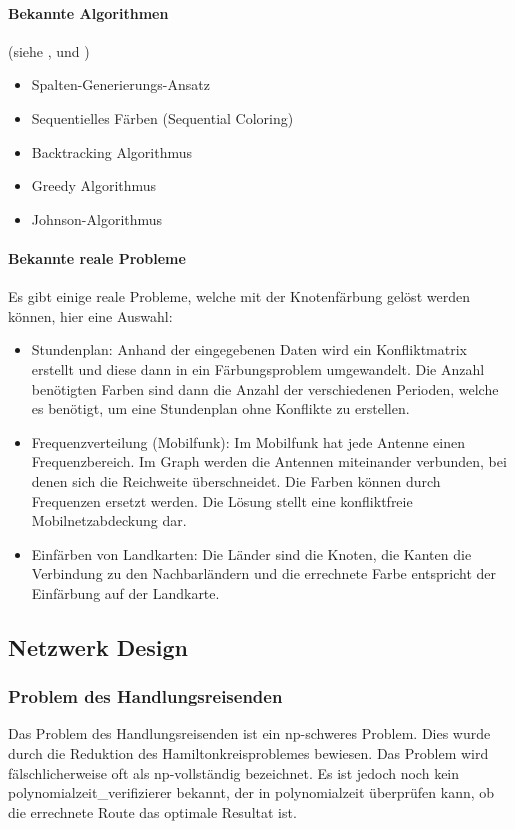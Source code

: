 	\paragraph{Bekannte Algorithmen}
	(siehe \cite{seminar_algo_graph}, \cite{krumke2012graphentheoretische} und \cite{seminar_rob_graphen})
	\begin{itemize}
		\item Spalten-Generierungs-Ansatz
		\item Sequentielles Färben (Sequential Coloring)
		\item Backtracking Algorithmus
		\item Greedy Algorithmus
		\item Johnson-Algorithmus
	\end{itemize}	

	\paragraph{Bekannte reale Probleme}	
	Es gibt einige reale Probleme, welche mit der Knotenfärbung gelöst werden können, hier eine Auswahl:
	\begin{itemize}
		\item Stundenplan: Anhand der eingegebenen Daten wird ein Konfliktmatrix erstellt und diese dann in ein Färbungsproblem umgewandelt. Die Anzahl benötigten Farben sind dann 
			die Anzahl der verschiedenen Perioden, welche es benötigt, um eine Stundenplan ohne Konflikte zu erstellen. \cite{ieee_exam_table_graph_coloring} \cite{time_table_graph_coloring} \cite{timetabling_abdullah}
		\item Frequenzverteilung (Mobilfunk): Im Mobilfunk hat jede Antenne einen Frequenzbereich. Im Graph werden die Antennen miteinander verbunden, bei denen sich die 
			Reichweite überschneidet. Die Farben können durch Frequenzen ersetzt werden. Die Lösung stellt eine konfliktfreie Mobilnetzabdeckung dar. \cite{seminar_rob_graphen}
		\item Einfärben von Landkarten: Die Länder sind die Knoten, die Kanten die Verbindung zu den Nachbarländern und die errechnete Farbe entspricht der Einfärbung auf der 
			Landkarte. \cite{seminar_rob_graphen}
	\end{itemize}

\newpage
\subsection{Netzwerk Design}\label{network_design}

	\subsubsection{Problem des Handlungsreisenden}\label{tsp}
	Das Problem des Handlungsreisenden ist ein \gls{np}-schweres Problem. Dies wurde durch die Reduktion des Hamiltonkreisproblemes bewiesen. Das Problem wird fälschlicherweise oft als 
	\gls{np}-vollständig bezeichnet. Es ist jedoch noch kein \gls{polynomialzeit_verifizierer} bekannt, der in \gls{polynomialzeit} überprüfen kann, ob die errechnete Route das optimale Resultat 
	ist.


